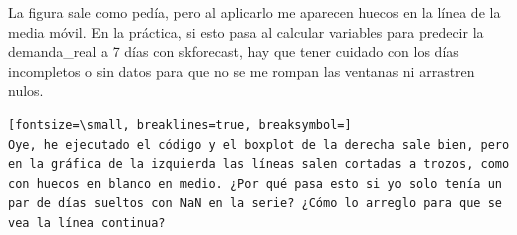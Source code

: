 \documentclass[12pt,a4paper,oneside]{book}
\begin{document}
\begin{iaanalisis}
La figura sale como pedía, pero al aplicarlo me aparecen huecos en la línea de la media móvil. En la práctica, si esto pasa al calcular variables para predecir la demanda\_real a 7 días con skforecast, hay que tener cuidado con los días incompletos o sin datos para que no se me rompan las ventanas ni arrastren nulos.
\end{iaanalisis}





\begin{iaprompt}
\begin{Verbatim}[fontsize=\small, breaklines=true, breaksymbol=]
Oye, he ejecutado el código y el boxplot de la derecha sale bien, pero en la gráfica de la izquierda las líneas salen cortadas a trozos, como con huecos en blanco en medio. ¿Por qué pasa esto si yo solo tenía un par de días sueltos con NaN en la serie? ¿Cómo lo arreglo para que se vea la línea continua?
\end{Verbatim}
\end{iaprompt}
\end{document}

